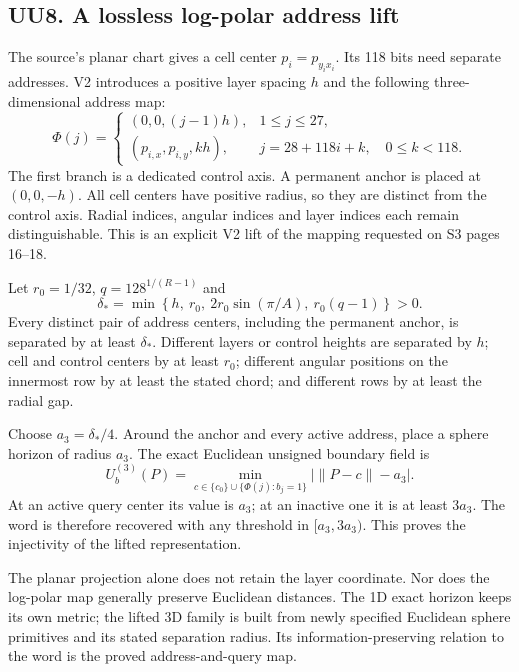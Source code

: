 \documentclass[11pt,a4paper]{article}
\numberwithin{equation}{section}
\begin{document}
\subsection{UU8. A lossless log-polar address lift}
The source's planar chart gives a cell center $p_i=p_{y_i x_i}$. Its 118 bits need separate addresses. V2 introduces a positive layer spacing $h$ and the following three-dimensional address map:
\begin{equation}
\Phi(j)=\begin{cases}
(0,0,(j-1)h),&1\le j\le27,\\
(p_{i,x},p_{i,y},kh),&j=28+118i+k,\quad0\le k<118.
\end{cases}
\label{eq:lift}
\end{equation}
The first branch is a dedicated control axis. A permanent anchor is placed at $(0,0,-h)$. All cell centers have positive radius, so they are distinct from the control axis. Radial indices, angular indices and layer indices each remain distinguishable. This is an explicit V2 lift of the mapping requested on S3 pages 16--18.

Let $r_0=1/32$, $q=128^{1/(R-1)}$ and
\begin{equation}
\delta_*=
\min\left\{h,\ r_0,\ 2r_0\sin(\pi/A),\ r_0(q-1)\right\}>0.
\end{equation}
Every distinct pair of address centers, including the permanent anchor, is separated by at least $\delta_*$. Different layers or control heights are separated by $h$; cell and control centers by at least $r_0$; different angular positions on the innermost row by at least the stated chord; and different rows by at least the radial gap.

Choose $a_3=\delta_*/4$. Around the anchor and every active address, place a sphere horizon of radius $a_3$. The exact Euclidean unsigned boundary field is
\begin{equation}
U_b^{(3)}(P)=\min_{c\in\{c_0\}\cup\{\Phi(j):b_j=1\}}
\left|\|P-c\|-a_3\right|.
\end{equation}
At an active query center its value is $a_3$; at an inactive one it is at least $3a_3$. The word is therefore recovered with any threshold in $[a_3,3a_3)$. This proves the injectivity of the lifted representation.

The planar projection alone does not retain the layer coordinate. Nor does the log-polar map generally preserve Euclidean distances. The 1D exact horizon keeps its own metric; the lifted 3D family is built from newly specified Euclidean sphere primitives and its stated separation radius. Its information-preserving relation to the word is the proved address-and-query map.
\end{document}
